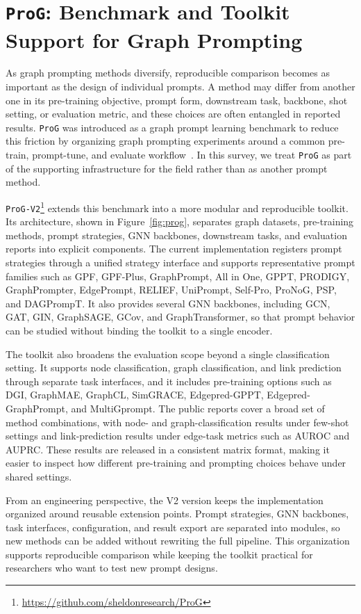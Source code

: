 \section{\texttt{ProG}: Benchmark and Toolkit Support for Graph Prompting}\label{sec:prog}
As graph prompting methods diversify, reproducible comparison becomes as important as the design of individual prompts. A method may differ from another one in its pre-training objective, prompt form, downstream task, backbone, shot setting, or evaluation metric, and these choices are often entangled in reported results. \texttt{ProG} was introduced as a graph prompt learning benchmark to reduce this friction by organizing graph prompting experiments around a common pre-train, prompt-tune, and evaluate workflow~\cite{zi2024prog}. In this survey, we treat \texttt{ProG} as part of the supporting infrastructure for the field rather than as another prompt method.

\texttt{ProG-V2}\footnote{\url{https://github.com/sheldonresearch/ProG}} extends this benchmark into a more modular and reproducible toolkit. Its architecture, shown in Figure~\ref{fig:prog}, separates graph datasets, pre-training methods, prompt strategies, GNN backbones, downstream tasks, and evaluation reports into explicit components. The current implementation registers prompt strategies through a unified strategy interface and supports representative prompt families such as GPF, GPF-Plus, GraphPrompt, All in One, GPPT, PRODIGY, GraphPrompter, EdgePrompt, RELIEF, UniPrompt, Self-Pro, ProNoG, PSP, and DAGPrompT. It also provides several GNN backbones, including GCN, GAT, GIN, GraphSAGE, GCov, and GraphTransformer, so that prompt behavior can be studied without binding the toolkit to a single encoder.

The toolkit also broadens the evaluation scope beyond a single classification setting. It supports node classification, graph classification, and link prediction through separate task interfaces, and it includes pre-training options such as DGI, GraphMAE, GraphCL, SimGRACE, Edgepred-GPPT, Edgepred-GraphPrompt, and MultiGprompt. The public reports cover a broad set of method combinations, with node- and graph-classification results under few-shot settings and link-prediction results under edge-task metrics such as AUROC and AUPRC. These results are released in a consistent matrix format, making it easier to inspect how different pre-training and prompting choices behave under shared settings.

From an engineering perspective, the V2 version keeps the implementation organized around reusable extension points. Prompt strategies, GNN backbones, task interfaces, configuration, and result export are separated into modules, so new methods can be added without rewriting the full pipeline. This organization supports reproducible comparison while keeping the toolkit practical for researchers who want to test new prompt designs.

